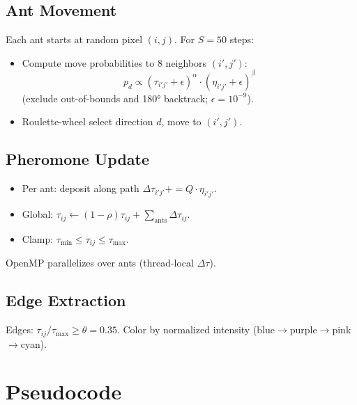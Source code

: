 \documentclass[11pt,a4paper]{article}
\begin{document}
\subsection{Ant Movement}
Each ant starts at random pixel $(i,j)$. For $S=50$ steps:
\begin{itemize}
\item Compute move probabilities to 8 neighbors $(i',j')$:
\[
p_d \propto (\tau_{i'j'} + \epsilon)^\alpha \cdot (\eta_{i'j'} + \epsilon)^\beta
\]
(exclude out-of-bounds and 180° backtrack; $\epsilon=10^{-9}$).
\item Roulette-wheel select direction $d$, move to $(i',j')$.
\end{itemize}

\subsection{Pheromone Update}
\begin{itemize}
\item Per ant: deposit along path $\Delta\tau_{i'j'} += Q \cdot \eta_{i'j'}$.
\item Global: $\tau_{ij} \leftarrow (1-\rho)\tau_{ij} + \sum_{\text{ants}} \Delta\tau_{ij}$.
\item Clamp: $\tau_{\min} \leq \tau_{ij} \leq \tau_{\max}$.
\end{itemize}
OpenMP parallelizes over ants (thread-local $\Delta\tau$).

\subsection{Edge Extraction}
Edges: $\tau_{ij}/\tau_{\max} \geq \theta=0.35$. Color by normalized intensity (blue$\to$purple$\to$pink$\to$cyan).

\section{Pseudocode}
\end{document}
